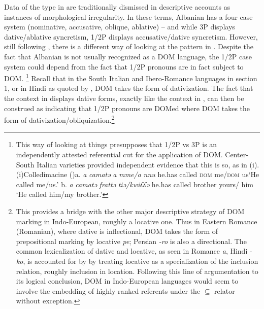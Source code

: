 \documentclass[output=paper,nonflat,modfonts]{langsci/langscibook}
\begin{document}
Data of the type in  are traditionally dismissed in descriptive accounts as instances of morphological irregularity. In these terms, Albanian has a four case system (nominative, accusative, oblique, ablative) – and while 3P displays dative/ablative syncretism, 1/2P displays accusative/dative syncretism. However, still following \citet{ManziniSavoia2014}, there is a different way of looking at the pattern in . Despite the fact that Albanian is not usually recognized as a DOM language, the 1/2P case system could depend from the fact that 1/2P pronouns are in fact subject to DOM.\textstyleFootnoteSymbol{} \footnote{This way of looking at things presupposes that 1/2P vs 3P is an independently attested referential cut for the application of DOM. Center-South Italian varieties provided independent evidence that this is so, as in (i).\textrm{(i)Colledimacine (\citealt{ManziniSavoia2005})}\textrm{a.} \textrm{\textit{a}   \textit{camatə} \textit{a} \textit{mme/a} \textit{nnu}} \textrm{he.has  called} \textrm{\textsc{dom}} \textrm{me/}\textrm{\textsc{dom}} \textrm{us}\textrm{‘He called me/us.’} \textrm{b.} \textrm{\textit{a}   \textit{camatə} \textit{frattə} \textit{tiə/kwiʎʎə}} \textrm{he.has  called   brother yours/ him} ‘He called him/my brother.’  } \textstyleFootnoteSymbol{}  Recall that in the South Italian and Ibero-Romance languages in section 1, or in Hindi as quoted by \citet{Torrego1998}, DOM takes the form of dativization. The fact that the context in  displays dative forms, exactly like the context in , can then be construed as indicating that 1/2P pronouns are DOMed where DOM takes the form of dativization/obliquization.\footnote{ This provides a bridge with the other major descriptive strategy of DOM marking in Indo-European, roughly a locative one. Thus in Eastern Romance (Romanian), where dative is inflectional, DOM takes the form of prepositional marking by locative \textit{pe}; Persian \textit{{}-ro} is also a directional.  The common lexicalization of dative and locative, as seen in Romance \textit{a}, Hindi -\textit{ko}, is accounted for by \citet{FrancoManzini2017} by treating locative as a specialization of the inclusion relation, roughly inclusion in location. Following this line of argumentation to its logical conclusion, DOM in Indo-European languages would seem to involve the embedding of highly ranked referents under the \textrm{${\subseteq}$} relator without exception.}  
\end{document}

